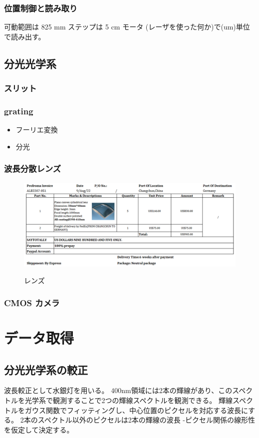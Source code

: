 \documentclass[a4paper,11pt,uplatex]{jsbook}
\begin{document}
\subsubsection{位置制御と読み取り}
可動範囲は 825 mm
ステップは 5 cm
モータ
(レーザを使った何か)で(um)単位で読み出す。

\subsection{分光光学系}
\subsubsection{スリット}
\subsubsection{grating}
\begin{itemize}
  \item フーリエ変換
  \item 分光
\end{itemize}

\subsubsection{波長分散レンズ}
\begin{figure}[tb]
  \centering
  \includegraphics[width=0.8\linewidth]{image/3-lens.png}\\
  \caption{レンズ}
  \label{lens}
\end{figure}
\subsubsection{CMOS カメラ}

\section{データ取得}
\subsection{分光光学系の較正}
波長較正として水銀灯を用いる。
$400 \text{nm}$領域には2本の輝線があり、このスペクトルを光学系で観測することで2つの輝線スペクトルを観測できる。
輝線スペクトルをガウス関数でフィッティングし、中心位置のピクセルを対応する波長にする。
2本のスペクトル以外のピクセルは2本の輝線の波長 -ピクセル関係の線形性を仮定して決定する。
\end{document}
